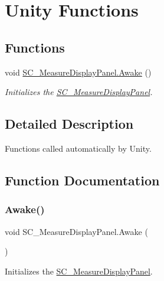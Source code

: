 \hypertarget{group___s_c___m_d_p_unity}{}\section{Unity Functions}
\label{group___s_c___m_d_p_unity}
\subsection*{Functions}
\begin{DoxyCompactItemize}
\item 
void \hyperlink{group___s_c___m_d_p_unity_gafe9062b7be241c5febf7b493bb6002f9}{S\+C\+\_\+\+Measure\+Display\+Panel.\+Awake} ()
\begin{DoxyCompactList}\small\item\em Initializes the \hyperlink{class_s_c___measure_display_panel}{S\+C\+\_\+\+Measure\+Display\+Panel}. \end{DoxyCompactList}\end{DoxyCompactItemize}


\subsection{Detailed Description}
Functions called automatically by Unity. 

\subsection{Function Documentation}
\mbox{\label{group___s_c___m_d_p_unity_gafe9062b7be241c5febf7b493bb6002f9}} 
\subsubsection{\texorpdfstring{Awake()}{Awake()}}
{\footnotesize\ttfamily void S\+C\+\_\+\+Measure\+Display\+Panel.\+Awake (\begin{DoxyParamCaption}{ }\end{DoxyParamCaption})\hspace{0.3cm}{\ttfamily [private]}}



Initializes the \hyperlink{class_s_c___measure_display_panel}{S\+C\+\_\+\+Measure\+Display\+Panel}. 



